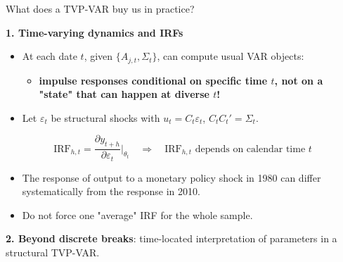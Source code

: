 \documentclass{beamer}
\begin{document}
\begin{frame}{What does a TVP-VAR buy us in practice?}
\small

\textbf{1. Time-varying dynamics and IRFs}

\begin{itemize}
  \item At each date $t$, given $\{A_{j,t}, \Sigma_t\}$, can compute usual VAR objects:
        \begin{itemize}

          \item \textbf{impulse responses conditional on specific time $t$, not on a "state" that can happen at diverse $t$! }
        \end{itemize}
  \item Let $\varepsilon_t$ be structural shocks with $u_t = C_t \varepsilon_t$, $C_t C_t' = \Sigma_t$.
\end{itemize}

\[
\text{IRF}_{h,t} =
\frac{\partial y_{t+h}}{\partial \varepsilon_t} \Big|_{\theta_t}
\quad \Rightarrow \quad
\text{IRF}_{h,t} \text{ depends on calendar time } t
\]

\begin{itemize}
  \item The response of output to a monetary policy shock in 1980
        can differ systematically from the response in 2010.
  \item Do not force one "average" IRF for the whole sample.
\end{itemize}

\textbf{2. Beyond discrete breaks}: time-located interpretation of parameters in a structural TVP-VAR.

\end{frame}
\end{document}
